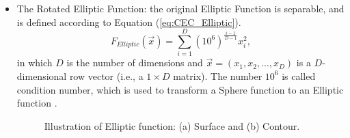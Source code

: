 \begin{itemize}
  \item The Rotated Elliptic Function: the original Elliptic Function is separable, and is defined according to Equation (\ref{eq:CEC_Elliptic}).
    \begin{equation}\label{eq:CEC_Elliptic}
    F_{Elliptic}(\vec{x}) = \sum_{i=1}^{D}(10^6)^{\frac{i-1}{D-1}}x_i^2,
    \end{equation}
    in which $D$ is the number of dimensions and $\vec{x} = (x_1, x_2, \ldots, x_D)$ is a $D$-dimensional row vector (i.e., a $1 \times D$ matrix). The number $10^6$ is called condition number, which is used to transform a Sphere function to an Elliptic function \cite{CEC:Suganthan2005}.
    \begin{figure}[!h]
    \centering
    \hspace{1mm}
    \caption{Illustration of Elliptic function: (a) Surface and (b) Contour.}
    \label{fig:CEC_Elliptic}
    \end{figure}


\end{itemize}
